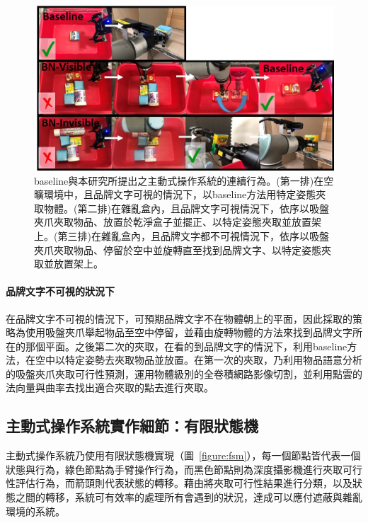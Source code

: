 \begin{figure}[H]
	\centering
	\includegraphics[height=!, width=1.0\linewidth, keepaspectratio=true]
	{./figures/active_manipulation_and_baseline.jpg}
  \caption{baseline與本研究所提出之主動式操作系統的連續行為。(第一排)在空曠環境中，且品牌文字可視的情況下，以baseline方法用特定姿態夾取物體。(第二排)在雜亂盒內，且品牌文字可視情況下，依序以吸盤夾爪夾取物品、放置於乾淨盒子並擺正、以特定姿態夾取並放置架上。(第三排)在雜亂盒內，且品牌文字都不可視情況下，依序以吸盤夾爪夾取物品、停留於空中並旋轉直至找到品牌文字、以特定姿態夾取並放置架上。
	}
  \label{figure:active_manipulation_and_baseline}
\end{figure}

\paragraph{品牌文字不可視的狀況下}
在品牌文字不可視的情況下，可預期品牌文字不在物體朝上的平面，因此採取的策略為使用吸盤夾爪舉起物品至空中停留，並藉由旋轉物體的方法來找到品牌文字所在的那個平面。之後第二次的夾取，在看的到品牌文字的情況下，利用baseline方法，在空中以特定姿勢去夾取物品並放置。在第一次的夾取，乃利用物品語意分析的吸盤夾爪夾取可行性預測，運用物體級別的全卷積網路影像切割，並利用點雲的法向量與曲率去找出適合夾取的點去進行夾取。



\subsection{主動式操作系統實作細節：有限狀態機}

主動式操作系統乃使用有限狀態機實現（圖~\ref{figure:fsm}），每一個節點皆代表一個狀態與行為，綠色節點為手臂操作行為，而黑色節點則為深度攝影機進行夾取可行性評估行為，而箭頭則代表狀態的轉移。藉由將夾取可行性結果進行分類，以及狀態之間的轉移，系統可有效率的處理所有會遇到的狀況，達成可以應付遮蔽與雜亂環境的系統。

